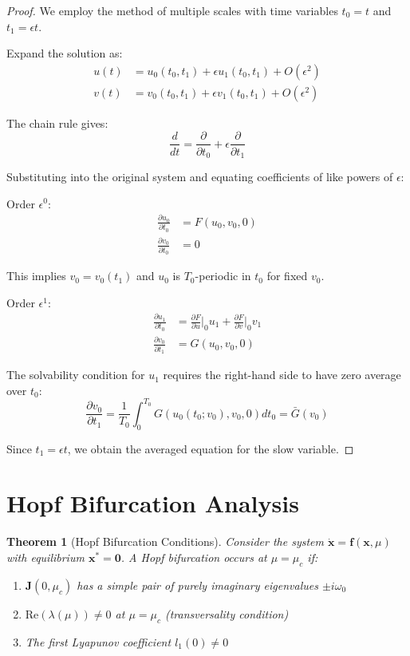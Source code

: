 \documentclass{article}
\newtheorem{theorem}{Theorem}
\begin{document}
\begin{proof}
We employ the method of multiple scales with time variables $t_0 = t$ and $t_1 = \epsilon t$.

Expand the solution as:
\begin{align}
u(t) &= u_0(t_0,t_1) + \epsilon u_1(t_0,t_1) + O(\epsilon^2) \\
v(t) &= v_0(t_0,t_1) + \epsilon v_1(t_0,t_1) + O(\epsilon^2)
\end{align}

The chain rule gives:
\begin{equation}
\frac{d}{dt} = \frac{\partial}{\partial t_0} + \epsilon \frac{\partial}{\partial t_1}
\end{equation}

Substituting into the original system and equating coefficients of like powers of $\epsilon$:

Order $\epsilon^0$:
\begin{align}
\frac{\partial u_0}{\partial t_0} &= F(u_0, v_0, 0) \\
\frac{\partial v_0}{\partial t_0} &= 0
\end{align}

This implies $v_0 = v_0(t_1)$ and $u_0$ is $T_0$-periodic in $t_0$ for fixed $v_0$.

Order $\epsilon^1$:
\begin{align}
\frac{\partial u_1}{\partial t_0} &= \frac{\partial F}{\partial u}\Big|_0 u_1 + \frac{\partial F}{\partial v}\Big|_0 v_1 \\
\frac{\partial v_0}{\partial t_1} &= G(u_0, v_0, 0)
\end{align}

The solvability condition for $u_1$ requires the right-hand side to have zero average over $t_0$:
\begin{equation}
\frac{\partial v_0}{\partial t_1} = \frac{1}{T_0}\int_0^{T_0} G(u_0(t_0;v_0), v_0, 0) dt_0 = \bar{G}(v_0)
\end{equation}

Since $t_1 = \epsilon t$, we obtain the averaged equation for the slow variable.
\end{proof}

\section{Hopf Bifurcation Analysis}

\begin{theorem}[Hopf Bifurcation Conditions]
Consider the system $\dot{\mathbf{x}} = \mathbf{f}(\mathbf{x}, \mu)$ with equilibrium $\mathbf{x}^* = \mathbf{0}$. A Hopf bifurcation occurs at $\mu = \mu_c$ if:
\begin{enumerate}
\item $\mathbf{J}(0, \mu_c)$ has a simple pair of purely imaginary eigenvalues $\pm i\omega_0$
\item $\text{Re}(\lambda(\mu)) \neq 0$ at $\mu = \mu_c$ (transversality condition)
\item The first Lyapunov coefficient $l_1(0) \neq 0$
\end{enumerate}
\end{theorem}
\end{document}
